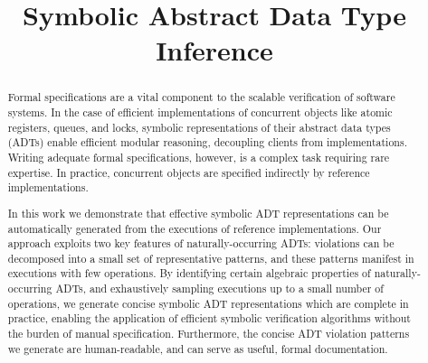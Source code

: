\documentclass[9pt,preprint,nocopyrightspace,natbib,authoryear]{sigplanconf}
\begin{document}
\setlength{\pdfpageheight}{\paperheight}
\setlength{\pdfpagewidth}{\paperwidth}






\title{Symbolic Abstract Data Type Inference}

\authorinfo{}{}{}


\maketitle

\begin{abstract}

  Formal specifications are a vital component to the scalable verification of
  software systems. In the case of efficient implementations of concurrent
  objects like atomic registers, queues, and locks, symbolic representations
  of their abstract data types (ADTs) enable efficient modular reasoning,
  decoupling clients from implementations. Writing adequate formal
  specifications, however, is a complex task requiring rare expertise. In
  practice, concurrent objects are specified indirectly by reference
  implementations.

  In this work we demonstrate that effective symbolic ADT representations can
  be automatically generated from the executions of reference implementations.
  Our approach exploits two key features of naturally-occurring ADTs: violations
  can be decomposed into a small set of representative patterns, and these
  patterns manifest in executions with few operations. By identifying certain
  algebraic properties of naturally-occurring ADTs, and exhaustively sampling
  executions up to a small number of operations, we generate concise symbolic
  ADT representations which are complete in practice, enabling the application
  of efficient symbolic verification algorithms without the burden of manual
  specification. Furthermore, the concise ADT violation patterns we generate
  are human-readable, and can serve as useful, formal documentation.

\end{abstract}
\end{document}
